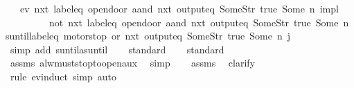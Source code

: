 \begin{isabellebody}
\ \ \ {\isachardoublequoteopen}{\isacharparenleft}{\isacharparenleft}ev\ {\isacharparenleft}nxt\ {\isacharparenleft}{\isacharparenleft}label{\isacharunderscore}eq\ {\isacharprime}{\isacharprime}opendoor{\isacharprime}{\isacharprime}{\isacharparenright}\ aand\ {\isacharparenleft}nxt\ {\isacharparenleft}output{\isacharunderscore}eq\ {\isacharbrackleft}Some{\isacharparenleft}Str\ {\isacharprime}{\isacharprime}true{\isacharprime}{\isacharprime}{\isacharparenright}{\isacharcomma}\ Some\ n{\isacharbrackright}{\isacharparenright}{\isacharparenright}{\isacharparenright}{\isacharparenright}{\isacharparenright}\ impl\isanewline
\ \ \ \ \ \ \ \ \ {\isacharparenleft}{\isacharparenleft}not\ {\isacharparenleft}nxt\ {\isacharparenleft}label{\isacharunderscore}eq\ {\isacharprime}{\isacharprime}opendoor{\isacharprime}{\isacharprime}\ aand\ {\isacharparenleft}nxt\ {\isacharparenleft}output{\isacharunderscore}eq\ {\isacharbrackleft}Some{\isacharparenleft}Str\ {\isacharprime}{\isacharprime}true{\isacharprime}{\isacharprime}{\isacharparenright}{\isacharcomma}\ Some\ n{\isacharbrackright}{\isacharparenright}{\isacharparenright}{\isacharparenright}{\isacharparenright}{\isacharparenright}\ suntil{\isacharparenleft}{\isacharparenleft}{\isacharparenleft}label{\isacharunderscore}eq\ {\isacharprime}{\isacharprime}motorstop{\isacharprime}{\isacharprime}{\isacharparenright}\ or\ {\isacharparenleft}nxt\ {\isacharparenleft}output{\isacharunderscore}eq\ {\isacharbrackleft}Some{\isacharparenleft}Str\ {\isacharprime}{\isacharprime}true{\isacharprime}{\isacharprime}{\isacharparenright}{\isacharcomma}\ Some\ n{\isacharbrackright}{\isacharparenright}{\isacharparenright}{\isacharparenright}{\isacharparenright}{\isacharparenright}{\isacharparenright}\ j{\isachardoublequoteclose}\isanewline
%
\isadelimproof
\ \ %
\endisadelimproof
%
\isatagproof
{}\isamarkupfalse%
\ {\isacharparenleft}simp\ add{\isacharcolon}\ suntil{\isacharunderscore}as{\isacharunderscore}until{\isacharparenright}\isanewline
\ \ \isamarkupfalse%
\ standard\isanewline
\ \ \isamarkupfalse%
\ standard\isanewline
\ \ \isamarkupfalse%
\ assms\ alw{\isacharunderscore}must{\isacharunderscore}stop{\isacharunderscore}to{\isacharunderscore}open{\isacharunderscore}aux\ \isamarkupfalse%
\ simp\isanewline
\ \ \isamarkupfalse%
\ assms\ \isamarkupfalse%
\ clarify\isanewline
\ \ \isamarkupfalse%
\ {\isacharparenleft}rule\ ev{\isachardot}induct{\isacharcomma}\ simp{\isacharcomma}\ auto{\isacharparenright}%

\end{isabellebody}
